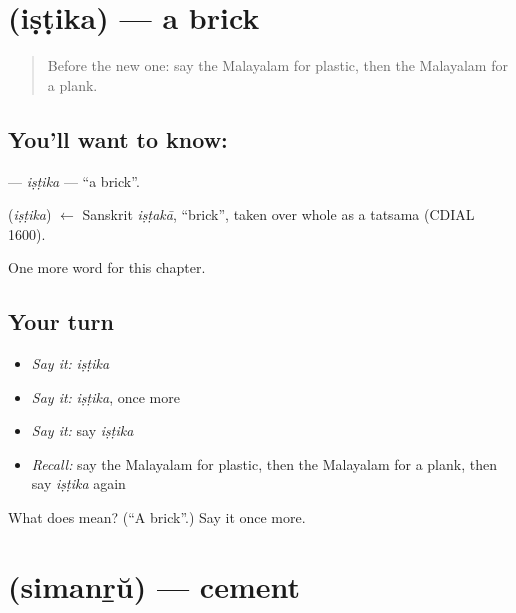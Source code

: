 \section[\texorpdfstring{\ml{ഇഷ്ടിക} (iṣṭika)}{ഇഷ്ടിക (iṣṭika)}]{ (iṣṭika) — a brick}

\label{lesson:ML-C216-istika}



\begin{quote}
Before the new one: say the Malayalam for plastic, then the Malayalam for a plank.
\end{quote}

\subsection*{You'll want to know: }
\textbf{} — \emph{iṣṭika} — \textquotedblleft{}a brick\textquotedblright{}.

\begin{cousinweb}
\textbf{} (\emph{iṣṭika}) $\leftarrow$ Sanskrit \emph{iṣṭakā}, \textquotedblleft{}brick\textquotedblright{}, taken over whole as a tatsama (CDIAL 1600).
\end{cousinweb}

\begin{grammarlens}[title={What you've built}]
One more word for this chapter.
\end{grammarlens}

\subsection*{Your turn}
\begin{itemize}
\raggedright
  \item \emph{Say it:} \emph{iṣṭika}
  \item \emph{Say it:} \emph{iṣṭika}, once more
  \item \emph{Say it:} say \emph{iṣṭika}
  \item \emph{Recall:} say the Malayalam for plastic, then the Malayalam for a plank, then say \emph{iṣṭika} again
\end{itemize}

\begin{tcolorbox}[breakable,colback=teal!4,colframe=teal!35!black,title={Before you move on}]
What does  mean? (\textquotedblleft{}A brick\textquotedblright{}.) Say it once more.
\end{tcolorbox}
\section[\texorpdfstring{\ml{സിമന്റ്} (simanṟŭ)}{സിമന്റ് (simanṟŭ)}]{ (simanṟŭ) — cement}

